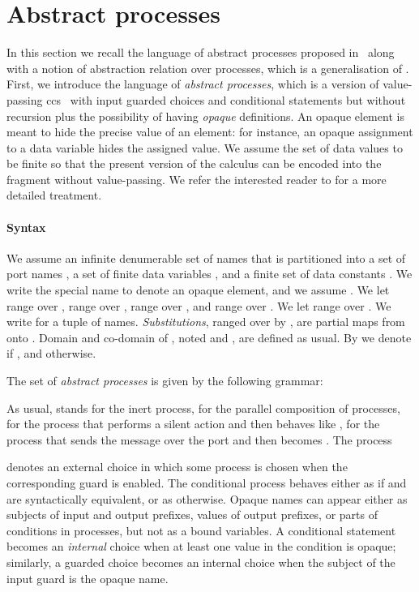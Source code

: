 \documentclass[submission,copyright,creativecommons]{eptcs}
\begin{document}
\section{Abstract processes}
\label{sec:concrete-processes}

In this section we recall the language of abstract processes proposed
in~\cite{BM:APOL} along with a notion of abstraction relation over processes, 
which is a generalisation of \cite{BD:SSPC}.
First, we introduce the language of {\em abstract processes}, 
which is a version of value-passing {\sc  ccs}~\cite{Mil:CC} with 
input guarded choices and conditional statements but without recursion 
plus the possibility of having {\em opaque} definitions.
An opaque element is meant to hide the precise value of an element: for 
instance, an opaque assignment to a data variable hides the assigned value. 
We assume the set of data values to be finite so that the present 
version of the calculus can be encoded into the fragment without 
value-passing. We refer the interested reader to \cite{Mil:CC} for a more 
detailed treatment. 

\paragraph{Syntax}
\label{sec:synt-inform-semant-concrete}
We assume an infinite denumerable set of names 
that is partitioned into a set of port names ,
a set of finite data variables ,
and a finite set of data constants .
We write the special name  to denote an opaque element, and 
we assume . We let  range over 
,  range over , 
 range over , and 
 range over . We let  
range over . 
We write  for a tuple of names. {\em Substitutions}, 
ranged over by , are partial maps from 
 onto . 
Domain and co-domain of , noted  and , are 
defined as usual.  By  we denote  if , and  otherwise. 

The set of {\em abstract processes}  is given by the following grammar:

As usual,  stands for the inert process,  for the 
parallel composition of processes, 
 for the process that performs a silent action and then behaves 
like ,  for the process that sends the message 
 over the port  and then becomes . The process

denotes an external choice in which some process  is chosen when the corresponding guard  is enabled. The conditional process 
behaves either as  if  and  are syntactically equivalent, or
as  otherwise. Opaque names can appear either as subjects of 
input and output prefixes, values of output prefixes, or parts of 
conditions in  processes, but not as a bound variables. 
A conditional statement becomes an \emph{internal} choice when 
at least one value in the condition is opaque; similarly, a guarded choice  
becomes an internal choice when the subject of the input guard is the opaque 
name. 
\end{document}
